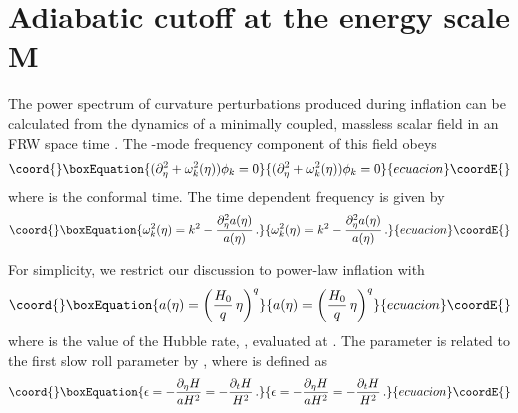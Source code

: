 \documentclass[a4paper,aps,prd,preprint,groupedaddress,nofootinbib]{revtex4}
\begin{document}
\section{Adiabatic cutoff at the energy scale M}

The power spectrum of curvature perturbations produced during
inflation can be calculated from the dynamics of a minimally coupled,
massless scalar field in an FRW space time \cite{MFB92}. The \coordHE{}-mode
frequency component of this field obeys 
\begin{equation}\coord{}\boxEquation{
\label{omeg}
(\partial_\eta^2 + \omega^2_k(\eta) ) \phi_k = 0
}{
(\partial_\eta^2 + \omega^2_k(\eta) ) \phi_k = 0
}{ecuacion}\coordE{}\end{equation}
where \myHighlight{$\eta$}\coordHE{} is the conformal time. The time dependent frequency is 
given by
\begin{equation}\coord{}\boxEquation{
\label{omega}
\omega^2_k(\eta) =  k^2 - 
\frac{\partial_\eta^2 a(\eta)}{a(\eta)} \, .
}{
\omega^2_k(\eta) =  k^2 - 
\frac{\partial_\eta^2 a(\eta)}{a(\eta)} \, .
}{ecuacion}\coordE{}\end{equation}

For simplicity, we restrict our discussion to power-law inflation with
\begin{equation}\coord{}\boxEquation{
a(\eta) = \left(\frac{H_0}{q} \, \eta \right)^q
}{
a(\eta) = \left(\frac{H_0}{q} \, \eta \right)^q
}{ecuacion}\coordE{}\end{equation}
where \coordHE{} is the value of the Hubble rate, \coordHE{},
evaluated at \coordHE{}.
The parameter \coordHE{} is related to the first slow roll parameter
\myHighlight{$\epsilon$}\coordHE{} by \coordHE{}, where \coordHE{} is defined as
\begin{equation}\coord{}\boxEquation{
\epsilon = - \frac{\partial_\eta H }{a H^2} = - \frac{\partial_t H }{ H^2}\, .
}{
\epsilon = - \frac{\partial_\eta H }{a H^2} = - \frac{\partial_t H }{ H^2}\, .
}{ecuacion}\coordE{}\end{equation}
\end{document}
